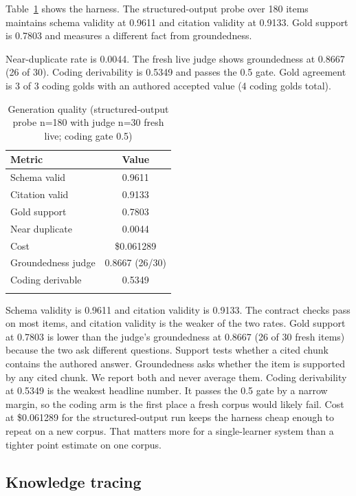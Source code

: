 \documentclass[sn-mathphys,Numbered]{sn-jnl}%
\theoremstyle{thmstyleone}%
\theoremstyle{thmstyletwo}%
\theoremstyle{thmstylethree}%
\begin{document}
Table~\ref{tab:generation} shows the harness. The structured-output probe over 180 items maintains schema validity at 0.9611 and citation validity at 0.9133. Gold support is 0.7803 and measures a different fact from groundedness.

Near-duplicate rate is 0.0044. The fresh live judge shows groundedness at 0.8667 (26 of 30). Coding derivability is 0.5349 and passes the 0.5 gate. Gold agreement is 3 of 3 coding golds with an authored accepted value (4 coding golds total).

\begin{table}[htbp]
\caption{Generation quality (structured-output probe n=180 with judge n=30 fresh live; coding gate 0.5)}\label{tab:generation}%
\begin{tabular*}{\textwidth}{@{\extracolsep\fill}lc@{}}
\toprule
Metric & Value \\
\midrule
Schema valid & 0.9611 \\
Citation valid & 0.9133 \\
Gold support & 0.7803 \\
Near duplicate & 0.0044 \\
Cost & \$0.061289 \\
Groundedness judge & 0.8667 (26/30) \\
Coding derivable & 0.5349 \\
\botrule
\end{tabular*}
\end{table}

Schema validity is 0.9611 and citation validity is 0.9133. The contract checks pass on most items, and citation validity is the weaker of the two rates. Gold support at 0.7803 is lower than the judge's groundedness at 0.8667 (26 of 30 fresh items) because the two ask different questions. Support tests whether a cited chunk contains the authored answer. Groundedness asks whether the item is supported by any cited chunk. We report both and never average them. Coding derivability at 0.5349 is the weakest headline number. It passes the 0.5 gate by a narrow margin, so the coding arm is the first place a fresh corpus would likely fail. Cost at \$0.061289 for the structured-output run keeps the harness cheap enough to repeat on a new corpus. That matters more for a single-learner system than a tighter point estimate on one corpus.

\subsection{Knowledge tracing}\label{subsec43}
\end{document}
